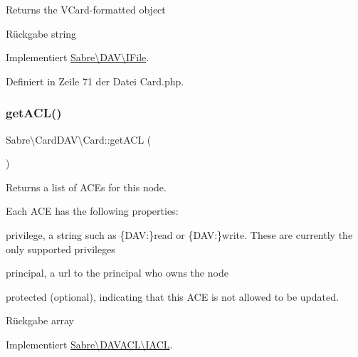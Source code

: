 Returns the V\+Card-\/formatted object

\begin{DoxyReturn}{Rückgabe}
string 
\end{DoxyReturn}


Implementiert \mbox{\hyperlink{interface_sabre_1_1_d_a_v_1_1_i_file_a3102812af0567c3cfd9cd6c20104bd27}{Sabre\textbackslash{}\+D\+A\+V\textbackslash{}\+I\+File}}.



Definiert in Zeile 71 der Datei Card.\+php.

\mbox{\label{class_sabre_1_1_card_d_a_v_1_1_card_a90af69dccfdb104a918c09aaad628594}} 
\subsubsection{\texorpdfstring{get\+A\+C\+L()}{getACL()}}
{\footnotesize\ttfamily Sabre\textbackslash{}\+Card\+D\+A\+V\textbackslash{}\+Card\+::get\+A\+CL (\begin{DoxyParamCaption}{ }\end{DoxyParamCaption})}

Returns a list of A\+CE\textquotesingle{}s for this node.

Each A\+CE has the following properties\+:
\begin{DoxyItemize}
\item \textquotesingle{}privilege\textquotesingle{}, a string such as \{D\+AV\+:\}read or \{D\+AV\+:\}write. These are currently the only supported privileges
\item \textquotesingle{}principal\textquotesingle{}, a url to the principal who owns the node
\item \textquotesingle{}protected\textquotesingle{} (optional), indicating that this A\+CE is not allowed to be updated.
\end{DoxyItemize}

\begin{DoxyReturn}{Rückgabe}
array 
\end{DoxyReturn}


Implementiert \mbox{\hyperlink{interface_sabre_1_1_d_a_v_a_c_l_1_1_i_a_c_l_a8fe3b3a5b48eae789d7eb722b340045c}{Sabre\textbackslash{}\+D\+A\+V\+A\+C\+L\textbackslash{}\+I\+A\+CL}}.



